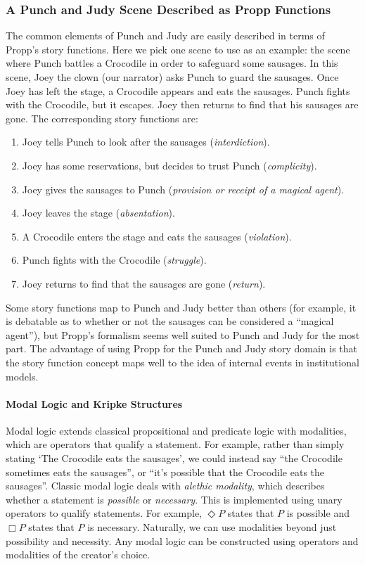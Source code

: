 \documentclass[11pt]{report}
\begin{document}
\subsubsection{A Punch and Judy Scene Described as Propp Functions}\label{sec:pjexample}
The common elements of Punch and Judy are easily described in terms of Propp's story functions. Here we pick one scene to use as an example: the scene where Punch battles a Crocodile in order to safeguard some sausages.  In this scene, Joey the clown (our narrator) asks Punch to guard the sausages. Once Joey has left the stage, a Crocodile appears and eats the sausages. Punch fights with the Crocodile, but it escapes. Joey then returns to find that his sausages are gone.
The corresponding story functions are:
\begin{enumerate}
  \item Joey tells Punch to look after the sausages (\emph{interdiction}).
  \item Joey has some reservations, but decides to trust Punch (\emph{complicity}).
  \item Joey gives the sausages to Punch (\emph{provision or receipt of a magical agent}).
  \item Joey leaves the stage (\emph{absentation}).
  \item A Crocodile enters the stage and eats the sausages (\emph{violation}).
  \item Punch fights with the Crocodile (\emph{struggle}).
  \item Joey returns to find that the sausages are gone (\emph{return}).
\end{enumerate}

Some story functions map to Punch and Judy better than others (for example, it is debatable as to whether or not the sausages can be considered a ``magical agent''), but Propp's formalism seems well suited to Punch and Judy for the most part. The advantage of using Propp for the Punch and Judy story domain is that the story function concept maps well to the idea of internal events in institutional models.

\paragraph{Modal Logic and Kripke Structures}
Modal logic extends classical propositional and predicate logic with modalities, which are operators that qualify a statement. For example, rather than simply stating `The Crocodile eats the sausages', we could instead say ``the Crocodile sometimes eats the sausages'', or ``it's possible that the Crocodile eats the sausages''.
Classic modal logic deals with \emph{alethic modality}, which describes whether a statement is \emph{possible} or \emph{necessary}. This is implemented using unary operators to qualify statements. For example, $\Diamond P$ states that $P$ is possible and $\Box P$ states that $P$ is necessary.
Naturally, we can use modalities beyond just possibility and necessity. Any
modal logic can be constructed using operators and modalities of the creator's choice.
\end{document}
